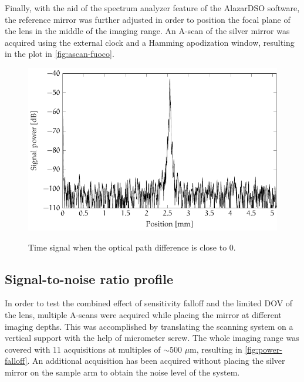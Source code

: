 Finally, with the aid of the spectrum analyzer feature of the AlazarDSO software, the reference mirror was further adjusted in order to position the focal plane of the lens in the middle of the imaging range. An A-scan of the silver mirror was acquired using the external clock and a Hamming apodization window, resulting in the plot in \autoref{fig:ascan-fuoco}.

\begin{figure}[hbt]
	\myfloatalign
	{	\includegraphics[width=0.85\linewidth]{gfx/ch3/fuoco}}
	\caption{Time signal when the optical path difference is close to 0.}\label{fig:ascan-fuoco}
\end{figure}


\subsection{Signal-to-noise ratio profile}
In order to test the combined effect of sensitivity falloff and the limited DOV of the lens, multiple A-scans were acquired while placing the mirror at different imaging depths. This was accomplished by translating the scanning system on a vertical support with the help of micrometer screw. The whole imaging range was covered with 11 acquisitions at multiples of $\sim 500$ $\mu$m, resulting in \autoref{fig:power-falloff}. An additional acquisition has been acquired without placing the silver mirror on the sample arm to obtain the noise level of the system. 


